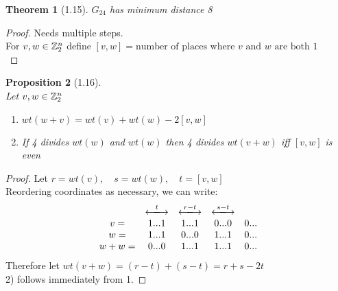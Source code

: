 \documentclass[]{article}
\newtheorem{thm}{Theorem}[section]
\newtheorem{prop}[thm]{Proposition}
\theoremstyle{definition}
\theoremstyle{remark}
\numberwithin{equation}{section}
\begin{document}
		\begin{thm}[1.15]
			$G_{24}$ has minimum distance 8\\
		\end{thm}
		\begin{proof}
			Needs multiple steps. \\
			For $v,w \in \mathbb{Z}_2^n$ define $[v,w] = \text{number of places where $v$ and $w$ are both 1}$\\
		\end{proof}
		\begin{prop}[1.16]\hfill\\
			Let $v,w \in \mathbb{Z}_2^n$\\
			\begin{enumerate}
				\item $wt(w+v) = wt(v) + wt(w) - 2[v,w]$\\
				\item If 4 divides $wt(w)$ and $wt(w)$ then 4 divides $wt(v+w)$ iff $[v,w]$ is even\\
			\end{enumerate}
		\end{prop}
		\begin{proof}
			Let $r = wt(v),\quad s = wt(w),\quad t = [v,w]$\\
			Reordering coordinates as necessary, we can write:\\
			\[
				\begin{matrix}
					& \xlongleftrightarrow{t} & \xlongleftrightarrow{r-t} & \xlongleftrightarrow{s-t}\\
				v  =& 1 ... 1  				  &1 ... 1 					  &0 ...0		    & 0 ... \\
				w  =& 1 ... 1  				  &0 ... 0 					  &1 ...1		    & 0 ... \\
				w+w=& 0 ... 0  				  &1 ... 1 					  &1 ...1		    & 0 ... \\
				\end{matrix}
			\]
			Therefore let $wt(v+w) = (r-t) + (s-t) = r +s - 2t$\\
			2) follows immediately from 1.
		\end{proof}
\end{document}
